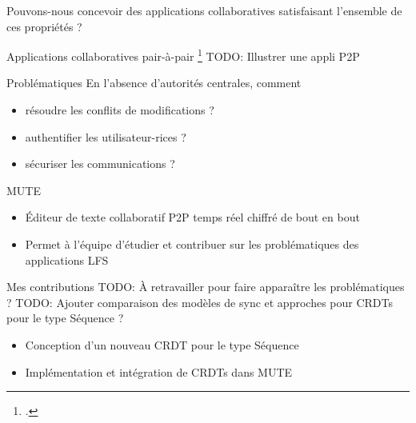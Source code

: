 \begin{frame}[standout]
    Pouvons-nous concevoir des applications collaboratives satisfaisant l'ensemble de ces propriétés ?
\end{frame}

\begin{frame}{Applications collaboratives pair-à-pair \footcite{localfirstsoftware2019}}
    TODO: Illustrer une appli P2P
    \begin{block}{Problématiques}
        En l'absence d'autorités centrales, comment
        \begin{itemize}
            \item résoudre les conflits de modifications ?
            \item authentifier les utilisateur-rices ?
            \item sécuriser les communications ?
        \end{itemize}
    \end{block}
\end{frame}


\begin{frame}{MUTE }
    \begin{figure}
    \end{figure}
    \begin{itemize}
        \item Éditeur de texte collaboratif P2P temps réel chiffré de bout en bout
        \item Permet à l'équipe d'étudier et contribuer sur les problématiques des applications \ac{LFS}
    \end{itemize}
\end{frame}

\begin{frame}{Mes contributions}
    TODO: À retravailler pour faire apparaître les problématiques ?
    TODO: Ajouter comparaison des modèles de sync et approches pour CRDTs pour le type Séquence ?
    \begin{itemize}
        \item Conception d'un nouveau \ac{CRDT} pour le type Séquence
        \item Implémentation et intégration de \acp{CRDT} dans MUTE
    \end{itemize}
\end{frame}
